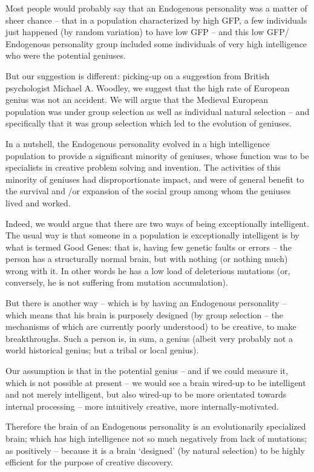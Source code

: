 \documentclass[
]{book}
\begin{document}
Most people would probably say that an Endogenous personality was a matter of sheer chance -- that in a population characterized by high GFP, a few individuals just happened (by random variation) to have low GFP -- and this low GFP/ Endogenous personality group included some individuals of very high intelligence who were the potential geniuses.

But our suggestion is different: picking-up on a suggestion from British psychologist Michael A. Woodley, we suggest that the high rate of European genius was not an accident. We will argue that the Medieval European population was under group selection as well as individual natural selection -- and specifically that it was group selection which led to the evolution of geniuses.

In a nutshell, the Endogenous personality evolved in a high intelligence population to provide a significant minority of geniuses, whose function was to be specialists in creative problem solving and invention. The activities of this minority of geniuses had disproportionate impact, and were of general benefit to the survival and /or expansion of the social group among whom the geniuses lived and worked.

Indeed, we would argue that there are two ways of being exceptionally intelligent. The usual way is that someone in a population is exceptionally intelligent is by what is termed Good Genes: that is, having few genetic faults or errors -- the person has a structurally normal brain, but with nothing (or nothing much) wrong with it. In other words he has a low load of deleterious mutations (or, conversely, he is not suffering from mutation accumulation).

But there is another way -- which is by having an Endogenous personality -- which means that his brain is purposely designed (by group selection -- the mechanisms of which are currently poorly understood) to be creative, to make breakthroughs. Such a person is, in sum, a genius (albeit very probably not a world historical genius; but a tribal or local genius).

Our assumption is that in the potential genius -- and if we could measure it, which is not possible at present -- we would see a brain wired-up to be intelligent and not merely intelligent, but also wired-up to be more orientated towards internal processing -- more intuitively creative, more internally-motivated.

Therefore the brain of an Endogenous personality is an evolutionarily specialized brain; which has high intelligence not so much negatively from lack of mutations; as positively -- because it is a brain `designed' (by natural selection) to be highly efficient for the purpose of creative discovery.
\end{document}
